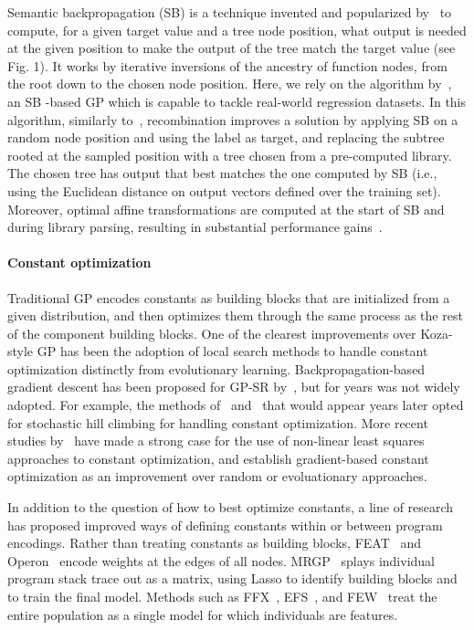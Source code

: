 Semantic backpropagation (SB) is a technique invented and popularized by~\cite{wieloch2013running,krawiec2013approximating,pawlak2014semantic} to compute, for a given target value and a tree node position, what output is needed at the given position to make the output of the tree match the target value (see Fig. 1). 
It works by iterative inversions of the ancestry of function nodes, from the root down to the chosen node position. 
Here, we rely on the algorithm by~\citet{virgolinLinearScalingSemantic2019}, an SB -based GP which is capable to tackle real-world regression datasets. 
In this algorithm, similarly to~\cite{wieloch2013running}, recombination improves a solution by applying SB on a random node position and using the label as target, and replacing the subtree rooted at the sampled position with a tree chosen from a pre-computed library. 
The chosen tree has output that best matches the one computed by SB (i.e., using the Euclidean distance on output vectors defined over the training set). 
Moreover, optimal affine transformations are computed at the start of SB and during library parsing, resulting in substantial performance gains~\cite{virgolinLinearScalingSemantic2019}.

\paragraph{Constant optimization}
Traditional GP encodes constants as building blocks that are initialized from a given distribution, and then optimizes them through the same process as the rest of the component building blocks.
One of the clearest improvements over Koza-style GP has been the adoption of local search methods to handle constant optimization distinctly from evolutionary learning. 
Backpropagation-based gradient descent has been proposed for GP-SR by~\citet{topchyFasterGeneticProgramming2001}, but for years was not widely adopted. 
For example, the methods of~\citet{bongardNonlinearSystemIdentification2005a} and~\citet{schmidtDistillingFreeformNatural2009} that would appear years later opted for stochastic hill climbing for handling constant optimization. 
More recent studies by~\cite{kommenda_effects_2013,kommendaParameterIdentificationSymbolic2019} have made a strong case for the use of non-linear least squares approaches to constant optimization, and establish gradient-based constant optimization as an improvement over random or evoluationary approaches.

In addition to the question of how to best optimize constants, a line of research has proposed improved ways of defining constants within or between program encodings. 
Rather than treating constants as building blocks, FEAT~\cite{lacavaLearningConciseRepresentations2019c} and Operon~\cite{burlacuOperonEfficientGenetic2020} encode weights at the edges of all nodes. 
MRGP~\cite{arnaldoMultipleRegressionGenetic2014a} splays individual program stack trace out as a matrix, using Lasso to identify building blocks and to train the final model.
Methods such as FFX~\cite{mcconaghyFFXFastScalable2011}, EFS~\cite{arnaldoBuildingPredictiveModels2015}, and FEW~\cite{lacavaGeneralFeatureEngineering2017} treat the entire population as a single model for which individuals are features.

